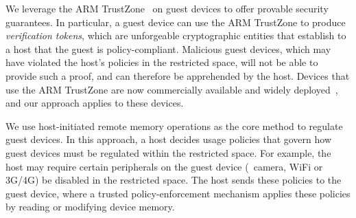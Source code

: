 \begin{mylist}
%
\item {} We leverage the ARM
TrustZone~\cite{armtz} on guest devices to offer provable security guarantees.
In particular, a guest device can use the ARM TrustZone to produce
\textit{verification tokens}, which are unforgeable cryptographic entities that
establish to a host that the guest is policy-compliant.  Malicious guest
devices, which may have violated the host's policies in the restricted space,
will not be able to provide such a proof, and can therefore be apprehended by
the host. Devices that use the ARM TrustZone are now commercially available and
widely deployed~\cite{knox:ccs14}, and our approach applies to these devices.
%
\item {} We use host-initiated remote memory
operations as the core method to regulate guest devices. In this approach, a
host decides usage policies that govern how guest devices must be regulated
within the restricted space. For example, the host may require certain
peripherals on the guest device (\eg~camera, WiFi or 3G/4G) be disabled in the
restricted space. The host sends these policies to the guest device, where a
trusted policy-enforcement mechanism applies these policies by reading or
modifying device memory. 


\end{mylist}
